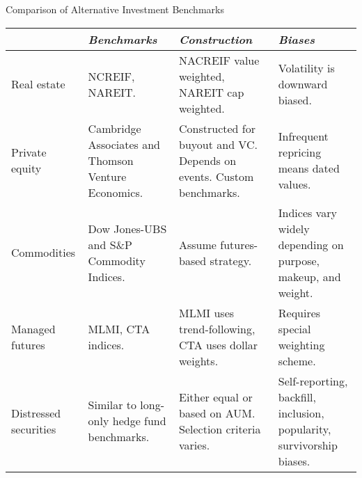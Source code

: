 \documentclass[../custom]{flashcards}
\begin{document}
\begin{flashcard}{Comparison of Alternative Investment Benchmarks}
    \begin{tabular}{
        >{\raggedright}p{.8in}
        >{\raggedright}p{1in}
        >{\raggedright}p{1.2in}
        >{\raggedright\arraybackslash}p{1.2in}}
        \toprule
        & \textit{Benchmarks} & \textit{Construction} & \textit{Biases}\\ \midrule
        Real estate &
        NCREIF, NAREIT. &
        NACREIF value weighted, NAREIT cap weighted. &
        Volatility is downward biased.\\ \midrule
        Private equity &
        Cambridge Associates and Thomson Venture Economics. &
        Constructed for buyout and VC. Depends on events. Custom benchmarks. &
        Infrequent repricing means dated values.\\ \midrule
        Commodities &
        Dow Jones-UBS and S\&P Commodity Indices. &
        Assume futures-based strategy. &
        Indices vary widely depending on purpose, makeup, and weight.\\ \midrule
        Managed futures &
        MLMI, CTA indices. &
        MLMI uses trend-following, CTA uses dollar weights. &
        Requires special weighting scheme.\\ \midrule
        Distressed securities &
        Similar to long-only hedge fund benchmarks. &
        Either equal or based on AUM. Selection criteria varies. &
        Self-reporting, backfill, inclusion, popularity, survivorship biases.\\ \bottomrule
    \end{tabular}
\end{flashcard}
\end{document}
